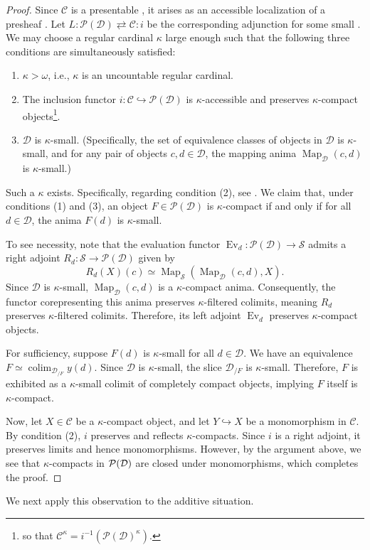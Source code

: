 \documentclass[a4paper,10pt, oneside]{amsart}
\begin{document}
	\begin{proof}
		Since $\mathcal{C}$ is a presentable \infcat, it arises as an accessible localization of a presheaf \infcat. Let $L \colon \mathcal{P}(\mathcal{D}) \rightleftarrows \mathcal{C} \colon i$ be the corresponding adjunction for some small \infcat \mcd.
		We may choose a regular cardinal $\kappa$ large enough such that the following three conditions are simultaneously satisfied:
		\begin{enumerate}
			\item $\kappa > \omega$, i.e., $\kappa$ is an uncountable regular cardinal.
			\item The inclusion functor $i \colon \mathcal{C} \hookrightarrow \mathcal{P}(\mathcal{D})$ is $\kappa$-accessible and preserves $\kappa$-compact objects\footnote{so that $\mathcal{C}^\kappa= i^{-1}(\mathcal{P}(\mathcal{D})^\kappa)$.}.
			\item $\mathcal{D}$ is $\kappa$-small. (Specifically, the set of equivalence classes of objects in $\mathcal{D}$ is $\kappa$-small, and for any pair of objects $c, d \in \mathcal{D}$, the mapping anima $\operatorname{Map}_{\mathcal{D}}(c, d)$ is $\kappa$-small.)
		\end{enumerate}
		Such a $\kappa$ exists. Specifically, regarding condition (2), see \cite[Remark 5.4.2.13]{htt}.
		We claim that, under conditions (1) and (3), an object $F \in \mathcal{P}(\mathcal{D})$ is $\kappa$-compact if and only if for all $d \in \mathcal{D}$, the anima $F(d)$ is $\kappa$-small.
		
		To see necessity, note that the evaluation functor $\operatorname{Ev}_d \colon \mathcal{P}(\mathcal{D}) \to \mathcal{S}$ admits a right adjoint $R_d \colon \mathcal{S} \to \mathcal{P}(\mathcal{D})$ given by $$R_d(X)(c) \simeq \operatorname{Map}_{\mathcal{S}}(\operatorname{Map}_{\mathcal{D}}(c, d), X).$$ Since $\mathcal{D}$ is $\kappa$-small, $\operatorname{Map}_{\mathcal{D}}(c, d)$ is a $\kappa$-compact anima. Consequently, the functor corepresenting this anima preserves $\kappa$-filtered colimits, meaning $R_d$ preserves $\kappa$-filtered colimits. Therefore, its left adjoint $\operatorname{Ev}_d$ preserves $\kappa$-compact objects.
		
		For sufficiency, suppose $F(d)$ is $\kappa$-small for all $d \in \mathcal{D}$. We have an equivalence $F \simeq \operatorname{colim}_{\mathcal{D}_{/F}} y(d)$. Since $\mathcal{D}$ is $\kappa$-small, the slice \infcat $\mathcal{D}_{/F}$ is $\kappa$-small. Therefore, $F$ is exhibited as a $\kappa$-small colimit of completely compact objects, implying $F$ itself is $\kappa$-compact.
		
		Now, let $X \in \mathcal{C}$ be a $\kappa$-compact object, and let $Y \hookrightarrow X$ be a monomorphism in $\mathcal{C}$. By condition (2), $i$ preserves and reflects $\kappa$-compacts. 
		Since $i$ is a right adjoint, it preserves limits and hence monomorphisms. However, by the argument above, we see that $\kappa$-compacts in $\mathcal{P}(\mathcal{D})$ are closed under monomorphisms, which completes the proof.
	\end{proof}
	We next apply this observation to the additive situation. 
	
\end{document}
